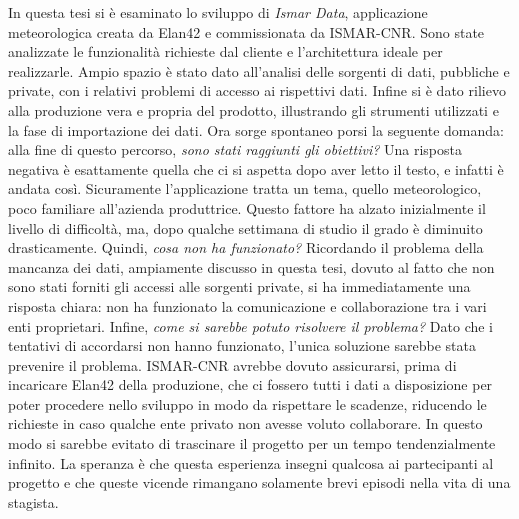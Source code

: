 \documentclass[./main.tex]{subfiles}
\begin{document}
In questa tesi si è esaminato lo sviluppo di \textit{Ismar Data}, applicazione meteorologica creata da Elan42 e commissionata da ISMAR-CNR. Sono state analizzate le funzionalità richieste dal cliente e l'architettura ideale per realizzarle. Ampio spazio è stato dato all'analisi delle sorgenti di dati, pubbliche e private, con i relativi problemi di accesso ai rispettivi dati. Infine si è dato rilievo alla produzione vera e propria del prodotto, illustrando gli strumenti utilizzati e la fase di importazione dei dati. Ora sorge spontaneo porsi la seguente domanda: alla fine di questo percorso, \textit{sono stati raggiunti gli obiettivi?} Una risposta negativa è esattamente quella che ci si aspetta dopo aver letto il testo, e infatti è andata così. Sicuramente l'applicazione tratta un tema, quello meteorologico, poco familiare all'azienda produttrice. Questo fattore ha alzato inizialmente il livello di difficoltà, ma, dopo qualche settimana di studio il grado è diminuito drasticamente. Quindi, \textit{cosa non ha funzionato?} Ricordando il problema della mancanza dei dati, ampiamente discusso in questa tesi, dovuto al fatto che non sono stati forniti gli accessi alle sorgenti private, si ha immediatamente una risposta chiara: non ha funzionato la comunicazione e collaborazione tra i vari enti proprietari. Infine, \textit{come si sarebbe potuto risolvere il problema?} Dato che i tentativi di accordarsi non hanno funzionato, l'unica soluzione sarebbe stata prevenire il problema. ISMAR-CNR avrebbe dovuto assicurarsi, prima di incaricare Elan42 della produzione, che ci fossero tutti i dati a disposizione per poter procedere nello sviluppo in modo da rispettare le scadenze, riducendo le richieste in caso qualche ente privato non avesse voluto collaborare. In questo modo si sarebbe evitato di trascinare il progetto per un tempo tendenzialmente infinito. La speranza è che questa esperienza insegni qualcosa ai partecipanti al progetto e che queste vicende rimangano solamente brevi episodi nella vita di una stagista. 
\end{document}
